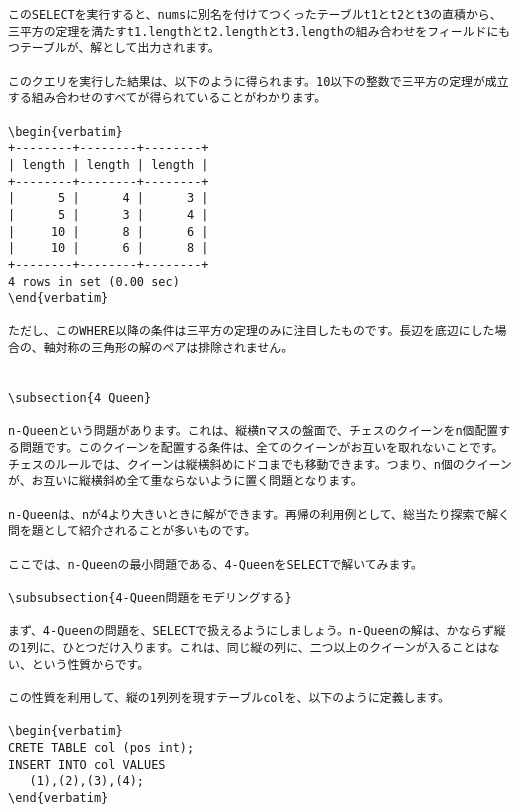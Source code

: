 \begin{lstlisting}[caption=自己結合の外部結合の例,label=sql:outer]
このSELECTを実行すると、numsに別名を付けてつくったテーブルt1とt2とt3の直積から、三平方の定理を満たすt1.lengthとt2.lengthとt3.lengthの組み合わせをフィールドにもつテーブルが、解として出力されます。

このクエリを実行した結果は、以下のように得られます。10以下の整数で三平方の定理が成立する組み合わせのすべてが得られていることがわかります。

\begin{verbatim}
+--------+--------+--------+
| length | length | length |
+--------+--------+--------+
|      5 |      4 |      3 |
|      5 |      3 |      4 |
|     10 |      8 |      6 |
|     10 |      6 |      8 |
+--------+--------+--------+
4 rows in set (0.00 sec)
\end{verbatim}

ただし、このWHERE以降の条件は三平方の定理のみに注目したものです。長辺を底辺にした場合の、軸対称の三角形の解のペアは排除されません。


\subsection{4 Queen}

n-Queenという問題があります。これは、縦横nマスの盤面で、チェスのクイーンをn個配置する問題です。このクイーンを配置する条件は、全てのクイーンがお互いを取れないことです。
チェスのルールでは、クイーンは縦横斜めにドコまでも移動できます。つまり、n個のクイーンが、お互いに縦横斜め全て重ならないように置く問題となります。

n-Queenは、nが4より大きいときに解ができます。再帰の利用例として、総当たり探索で解く問を題として紹介されることが多いものです。

ここでは、n-Queenの最小問題である、4-QueenをSELECTで解いてみます。

\subsubsection{4-Queen問題をモデリングする}

まず、4-Queenの問題を、SELECTで扱えるようにしましょう。n-Queenの解は、かならず縦の1列に、ひとつだけ入ります。これは、同じ縦の列に、二つ以上のクイーンが入ることはない、という性質からです。

この性質を利用して、縦の1列列を現すテーブルcolを、以下のように定義します。

\begin{verbatim}
CRETE TABLE col (pos int);
INSERT INTO col VALUES
   (1),(2),(3),(4);
\end{verbatim}


\end{lstlisting}
